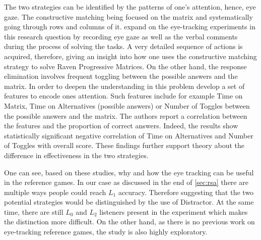 The two strategies can be identified by the patterns of one's attention, hence, eye gaze. The constructive matching being focused on the matrix and systematically going through rows and columns of it. \cite{Carpenter_1990} expand on the eye-tracking experiments in this research question by recording eye gaze as well as the verbal comments during the process of solving the tasks. A very detailed sequence of actions is acquired, therefore, giving an insight into how one uses the constructive matching strategy to solve Raven Progressive Matrices. On the other hand, the response elimination involves frequent toggling between the possible answers and the matrix. In order to deepen the understanding in this problem \cite{Vigneau_2006} develop a set of features to encode ones attention. Such features include for example Time on Matrix, Time on Alternatives (possible answers) or Number of Toggles between the possible answers and the matrix. The authors report a correlation between the features and the proportion of correct answers. Indeed, the results show statistically significant negative correlation of Time on Alternatives and Number of Toggles with overall score. These findings further support theory about the difference in effectiveness in the two strategies. 


One can see, based on these studies, why and how the eye tracking can be useful in the reference games. In our case as discussed in the end of \autoref{sec:rsa} there are multiple ways people could reach $L_1$ accuracy. Therefore suggesting that the two potential strategies would be distinguished by the use of Distractor. At the same time, there are still $L_0$ and $L_2$ listeners present in the experiment which makes the distinction more difficult. On the other hand, as there is no previous work on eye-tracking reference games, the study is also highly exploratory.

